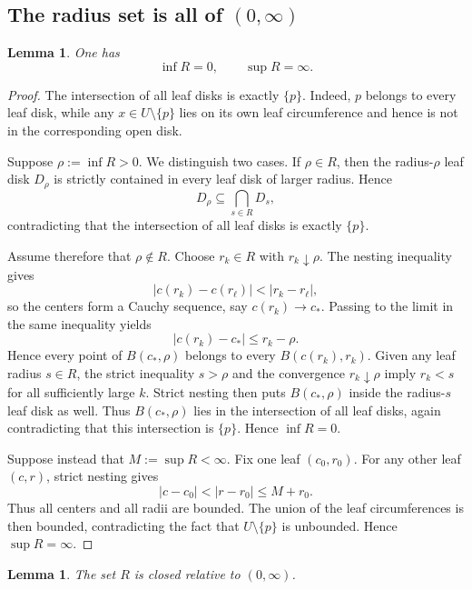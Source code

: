 \documentclass[11pt]{article}
\newtheorem{lemma}[theorem]{Lemma}
\begin{document}
\subsection{The radius set is all of \texorpdfstring{$(0,\infty)$}{(0,infinity)}}

\begin{lemma}\label{lem:endpointsR}
One has
\[
\inf R=0,
\qquad
\sup R=\infty.
\]
\end{lemma}

\begin{proof}
The intersection of all leaf disks is exactly $\{p\}$. Indeed, $p$ belongs to every leaf disk, while any $x\in U\setminus\{p\}$ lies on its own leaf circumference and hence is not in the corresponding open disk.

Suppose $\rho:=\inf R>0$. We distinguish two cases. If $\rho\in R$, then the radius-$\rho$ leaf disk $D_\rho$ is strictly contained in every leaf disk of larger radius. Hence
\[
D_\rho\subseteq\bigcap_{s\in R}D_s,
\]
contradicting that the intersection of all leaf disks is exactly $\{p\}$.

Assume therefore that $\rho\notin R$. Choose $r_k\in R$ with $r_k\downarrow\rho$. The nesting inequality gives
\[
|c(r_k)-c(r_\ell)|<|r_k-r_\ell|,
\]
so the centers form a Cauchy sequence, say $c(r_k)\to c_*$. Passing to the limit in the same inequality yields
\[
|c(r_k)-c_*|\le r_k-\rho.
\]
Hence every point of $B(c_*,\rho)$ belongs to every $B(c(r_k),r_k)$. Given any leaf radius $s\in R$, the strict inequality $s>\rho$ and the convergence $r_k\downarrow\rho$ imply $r_k<s$ for all sufficiently large $k$. Strict nesting then puts $B(c_*,\rho)$ inside the radius-$s$ leaf disk as well. Thus $B(c_*,\rho)$ lies in the intersection of all leaf disks, again contradicting that this intersection is $\{p\}$. Hence $\inf R=0$.

Suppose instead that $M:=\sup R<\infty$. Fix one leaf $(c_0,r_0)$. For any other leaf $(c,r)$, strict nesting gives
\[
|c-c_0|<|r-r_0|\le M+r_0.
\]
Thus all centers and all radii are bounded. The union of the leaf circumferences is then bounded, contradicting the fact that $U\setminus\{p\}$ is unbounded. Hence $\sup R=\infty$.
\end{proof}

\begin{lemma}\label{lem:Rclosed}
The set $R$ is closed relative to $(0,\infty)$.
\end{lemma}
\end{document}
